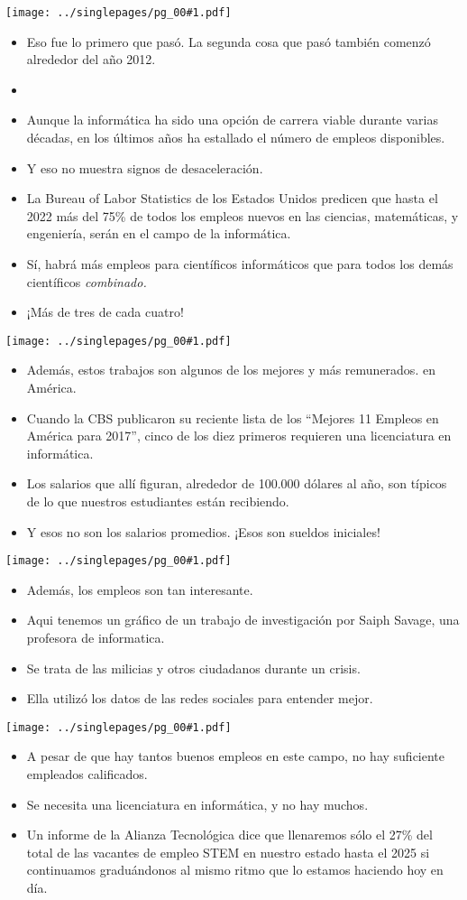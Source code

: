 \documentclass[12pt]{article}
\newcommand{\bi}{\begin{itemize}}
\newcommand{\ei}{\end{itemize}}
\newcommand{\cue}{\mbox{}
  \fbox{\sf Next slide}
}
\newcommand{\fig}[1]{
  \newpage  
  \begin{center}
    \texttt{[image: ../singlepages/pg\_00\#1.pdf]}
  \end{center}
  
}
\begin{document}
\fig{09}

\bi
\item Eso fue lo primero que pasó.
La segunda cosa que pasó también comenzó
  alrededor del año 2012.
\item \cue
\item
  Aunque la informática ha sido una opción
de carrera viable durante varias décadas, en los últimos años ha
estallado el número de empleos disponibles.
\item Y eso no muestra signos
  de desaceleración.
\item La Bureau of Labor Statistics de los Estados
Unidos predicen que hasta el 2022 más del 75\% de todos los empleos
nuevos en las ciencias, matemáticas, y engeniería, serán en el campo
de la informática.
\item
  Sí, habrá más empleos para científicos
informáticos que para todos los demás científicos {\em combinado.}

\item ¡Más de tres de cada cuatro!

\ei
\fig{10}

\bi
\item
  Además, estos trabajos son algunos de los mejores y más remunerados.
  en América.
\item Cuando la CBS publicaron su reciente lista de los
``Mejores 11 Empleos en América para 2017'', cinco de los diez
primeros requieren una licenciatura en informática. 
\item
 Los salarios que
allí figuran, alrededor de 100.000 dólares al año, son típicos de lo
que nuestros estudiantes están recibiendo.
\item
Y esos no son los salarios promedios.  ¡Esos son sueldos iniciales!
\ei

\fig{11}

\bi
\item
Además, los empleos son tan interesante.
\item
Aqui tenemos un gráfico de
un trabajo de investigación por Saiph Savage, una profesora de
informatica.
\item
Se trata de las milicias y otros ciudadanos durante un
crisis.
\item
  Ella utilizó los datos de las redes sociales para entender
mejor.
\ei

\fig{12}

\bi
\item
A pesar de que hay tantos buenos empleos en este campo,
no hay suficiente empleados calificados.
\item
Se necesita una licenciatura en informática, y no hay muchos.
\item
  Un informe de la Alianza Tecnológica dice que llenaremos sólo el 27\% del total de las vacantes de empleo STEM en nuestro estado hasta el 2025 si continuamos graduándonos al mismo ritmo que lo estamos haciendo hoy en día.
\ei
\end{document}
